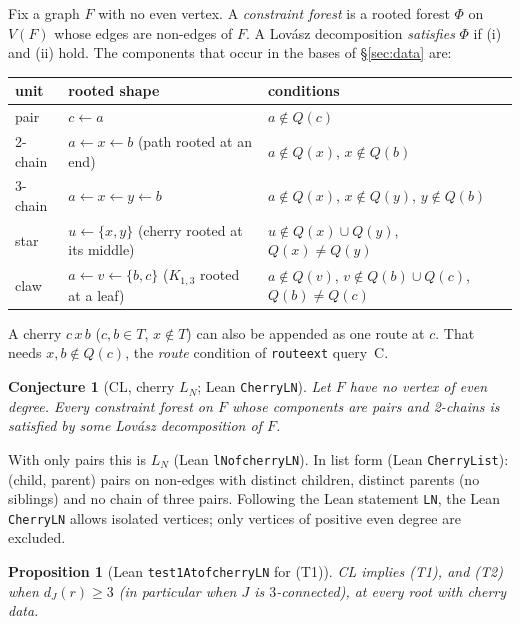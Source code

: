 \documentclass[11pt]{amsart}
\newtheorem{proposition}[theorem]{Proposition}
\newtheorem{conjecture}[theorem]{Conjecture}
\theoremstyle{definition}
\theoremstyle{remark}
\renewcommand{\_}{\oldunderscore\allowbreak}
\begin{document}
Fix a graph $F$ with no even vertex. A \emph{constraint forest} is a rooted forest $\Phi$ on
$V(F)$ whose edges are non-edges of $F$. A Lov\'asz decomposition \emph{satisfies} $\Phi$ if (i) and
(ii) hold. The components that occur in the bases of \S\ref{sec:data} are:
\begin{center}
\begin{tabular}{p{}p{}p{}}
\toprule
unit & rooted shape & conditions\\
\midrule
pair & $c\leftarrow a$ & $a\notin Q(c)$\\
2-chain & $a\leftarrow x\leftarrow b$ (path rooted at an end) & $a\notin Q(x)$, $x\notin Q(b)$\\
3-chain & $a\leftarrow x\leftarrow y\leftarrow b$ & $a\notin Q(x)$, $x\notin Q(y)$, $y\notin Q(b)$\\
star & $u\leftarrow\{x,y\}$ (cherry rooted at its middle) & $u\notin Q(x)\cup Q(y)$,
$Q(x)\ne Q(y)$\\
claw & $a\leftarrow v\leftarrow\{b,c\}$ ($K_{1,3}$ rooted at a leaf) & $a\notin Q(v)$, $v\notin
Q(b)\cup Q(c)$, $Q(b)\ne Q(c)$\\
\bottomrule
\end{tabular}
\end{center}
A cherry $c\,x\,b$ ($c,b\in T$, $x\notin T$) can also be appended as one route at $c$. That needs
$x,b\notin Q(c)$, the \emph{route} condition of \texttt{route\_ext} query~C.

\begin{conjecture}[CL, cherry $L_N$; Lean \texttt{CherryLN}]\label{conj:CL}
Let $F$ have no vertex of even degree. Every constraint forest on $F$ whose components are pairs and
2-chains is satisfied by some Lov\'asz decomposition of $F$.
\end{conjecture}

With only pairs this is $L_N$ (Lean \texttt{lN\_of\_cherryLN}). In list form (Lean
\texttt{CherryList}): (child, parent) pairs on non-edges with distinct children, distinct parents
(no siblings) and no chain of three pairs. Following the Lean statement \texttt{LN}, the Lean
\texttt{CherryLN} allows isolated vertices; only vertices of positive even degree are excluded.

\begin{proposition}[Lean \texttt{test1At\_of\_cherryLN} for (T1)]\label{prop:CLT1}
CL implies (T1), and (T2) when $d_J(r)\ge3$ (in particular when $J$ is $3$-connected), at every
root with cherry data.
\end{proposition}
\end{document}
